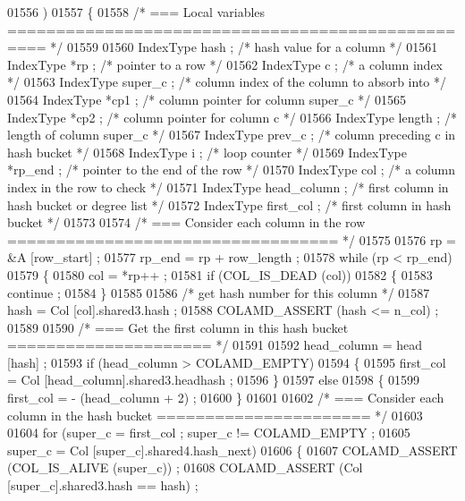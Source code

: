 \begin{DoxyCode}
{{{{{{{{{{{{{{{{{{{{{{{{{{{{01556 )
01557 \{
01558   \textcolor{comment}{/* === Local variables ================================================== */}
01559 
01560   IndexType hash ;      \textcolor{comment}{/* hash value for a column */}
01561   IndexType *rp ;     \textcolor{comment}{/* pointer to a row */}
01562   IndexType c ;     \textcolor{comment}{/* a column index */}
01563   IndexType super\_c ;   \textcolor{comment}{/* column index of the column to absorb into */}
01564   IndexType *cp1 ;      \textcolor{comment}{/* column pointer for column super\_c */}
01565   IndexType *cp2 ;      \textcolor{comment}{/* column pointer for column c */}
01566   IndexType length ;    \textcolor{comment}{/* length of column super\_c */}
01567   IndexType prev\_c ;    \textcolor{comment}{/* column preceding c in hash bucket */}
01568   IndexType i ;     \textcolor{comment}{/* loop counter */}
01569   IndexType *rp\_end ;   \textcolor{comment}{/* pointer to the end of the row */}
01570   IndexType col ;     \textcolor{comment}{/* a column index in the row to check */}
01571   IndexType head\_column ;   \textcolor{comment}{/* first column in hash bucket or degree list */}
01572   IndexType first\_col ;   \textcolor{comment}{/* first column in hash bucket */}
01573 
01574   \textcolor{comment}{/* === Consider each column in the row ================================== */}
01575 
01576   rp = &A [row\_start] ;
01577   rp\_end = rp + row\_length ;
01578   \textcolor{keywordflow}{while} (rp < rp\_end)
01579   \{
01580     col = *rp++ ;
01581     \textcolor{keywordflow}{if} (COL\_IS\_DEAD (col))
01582     \{
01583       continue ;
01584     \}
01585 
01586     \textcolor{comment}{/* get hash number for this column */}
01587     hash = Col [col].shared3.hash ;
01588     COLAMD\_ASSERT (hash <= n\_col) ;
01589 
01590     \textcolor{comment}{/* === Get the first column in this hash bucket ===================== */}
01591 
01592     head\_column = head [hash] ;
01593     \textcolor{keywordflow}{if} (head\_column > COLAMD\_EMPTY)
01594     \{
01595       first\_col = Col [head\_column].shared3.headhash ;
01596     \}
01597     \textcolor{keywordflow}{else}
01598     \{
01599       first\_col = - (head\_column + 2) ;
01600     \}
01601 
01602     \textcolor{comment}{/* === Consider each column in the hash bucket ====================== */}
01603 
01604     \textcolor{keywordflow}{for} (super\_c = first\_col ; super\_c != COLAMD\_EMPTY ;
01605      super\_c = Col [super\_c].shared4.hash\_next)
01606     \{
01607       COLAMD\_ASSERT (COL\_IS\_ALIVE (super\_c)) ;
01608       COLAMD\_ASSERT (Col [super\_c].shared3.hash == hash) ;
}}}}}}}}}}}}}}}}}}}}}}}}}}}}
\end{DoxyCode}
